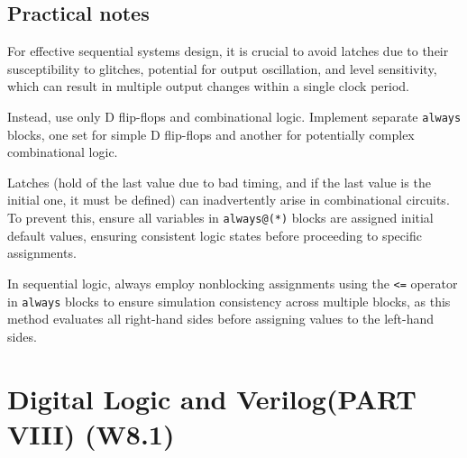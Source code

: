 \documentclass[12pt,openany]{book}
\begin{document}
\section{Practical notes}

For effective sequential systems design, it is crucial to avoid latches due to their susceptibility to glitches, potential for output oscillation, and level sensitivity, which can result in multiple output changes within a single clock period. \newline

Instead, use only D flip-flops and combinational logic. Implement separate \texttt{always} blocks, one set for simple D flip-flops and another for potentially complex combinational logic. \newline

Latches (hold of the last value due to bad timing, and if the last value is the initial one, it must be defined) can inadvertently arise in combinational circuits. To prevent this, ensure all variables in \texttt{always@(*)} blocks are assigned initial default values, ensuring consistent logic states before proceeding to specific assignments. \newline 

In sequential logic, always employ nonblocking assignments using the \texttt{<=} operator in \texttt{always} blocks to ensure simulation consistency across multiple blocks, as this method evaluates all right-hand sides before assigning values to the left-hand sides.\newline

\chapter{Digital Logic and Verilog(PART VIII) (W8.1)}
\end{document}
